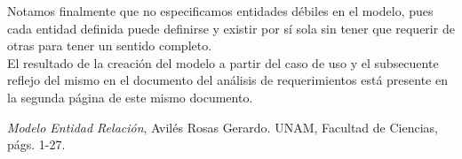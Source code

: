 \documentclass[11pt,letterpaper]{article}
\begin{document}
Notamos finalmente que no especificamos entidades débiles en el modelo, pues cada entidad definida puede definirse y existir por sí sola sin tener que requerir
de otras para tener un sentido completo.\\

El resultado de la creación del modelo a partir del caso de uso y el subsecuente reflejo del mismo en el documento del análisis de requerimientos está presente en la segunda página de este mismo documento.
 \begin{thebibliography}{1}


     \textit{Modelo Entidad Relación}, Avilés Rosas Gerardo. UNAM, Facultad de Ciencias, págs. 1-27.


  \end{thebibliography}
\end{document}
